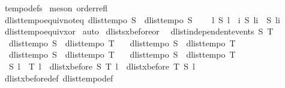 \begin{isabellebody}
%
\isadelimproof
%
\endisadelimproof
%
\isatagproof
{}\isamarkupfalse%
\ tempo{\isacharunderscore}defs\isanewline
{}\isamarkupfalse%
\ {\isacharparenleft}meson\ order{\isacharunderscore}refl{\isacharparenright}%
\endisatagproof
{\isafoldproof}%
%
\isadelimproof
\isanewline
%
\endisadelimproof
\isanewline
{}\isamarkupfalse%
\ dlist{\isacharunderscore}tempo{\isacharunderscore}equiv{\isacharunderscore}not{\isacharunderscore}eq{\isacharcolon}\ {\isachardoublequoteopen}dlist{\isacharunderscore}tempo{}\ S\ {\isasymLongrightarrow}\ dlist{\isacharunderscore}tempo{}\ S\ {\isasymLongrightarrow}\ \isanewline
\ \ {\isasymforall}l{\isachardot}\ S\ l\ {\isasymlongleftrightarrow}\ {\isacharparenleft}{\isasymforall}i{\isachardot}\ S\ {\isacharparenleft}l{\isasymdagger}{\isachardot}{\isachardot}i{\isacharparenright}\ {\isasymnoteq}\ S\ {\isacharparenleft}l{\isasymdagger}i{\isachardot}{\isachardot}{\isacharparenright}{\isacharparenright}{\isachardoublequoteclose}\isanewline
%
\isadelimproof
%
\endisadelimproof
%
\isatagproof
{}\isamarkupfalse%
\ dlist{\isacharunderscore}tempo{\isacharunderscore}equiv{\isacharunderscore}xor\isanewline
{}\isamarkupfalse%
\ auto%
\endisatagproof
{\isafoldproof}%
%
\isadelimproof
\isanewline
%
\endisadelimproof
\isanewline
{}\isamarkupfalse%
\ dlists{\isacharunderscore}xbefore{\isacharunderscore}or{}{\isacharcolon}\isanewline
\ \ {\isachardoublequoteopen}dlist{\isacharunderscore}independent{\isacharunderscore}events\ S\ T\ {\isasymLongrightarrow}\ \isanewline
\ \ dlist{\isacharunderscore}tempo{}\ S\ {\isasymLongrightarrow}\ dlist{\isacharunderscore}tempo{}\ T\ {\isasymLongrightarrow}\isanewline
\ \ dlist{\isacharunderscore}tempo{}\ S\ {\isasymLongrightarrow}\ dlist{\isacharunderscore}tempo{}\ T\ {\isasymLongrightarrow}\isanewline
\ \ dlist{\isacharunderscore}tempo{}\ S\ {\isasymLongrightarrow}\ dlist{\isacharunderscore}tempo{}\ T\ {\isasymLongrightarrow}\isanewline
\ \ dlist{\isacharunderscore}tempo{}\ S\ {\isasymLongrightarrow}\ dlist{\isacharunderscore}tempo{}\ T\ {\isasymLongrightarrow}\isanewline
\ \ S\ l\ {\isasymand}\ T\ l\ {\isasymLongrightarrow}\ dlist{\isacharunderscore}xbefore\ S\ T\ l\ {\isasymor}\ dlist{\isacharunderscore}xbefore\ T\ S\ l{\isachardoublequoteclose}\isanewline
%
\isadelimproof
%
\endisadelimproof
%
\isatagproof
{}\isamarkupfalse%
\ dlist{\isacharunderscore}xbefore{\isacharunderscore}def\ dlist{\isacharunderscore}tempo{\isacharunderscore}def\isanewline

\end{isabellebody}
